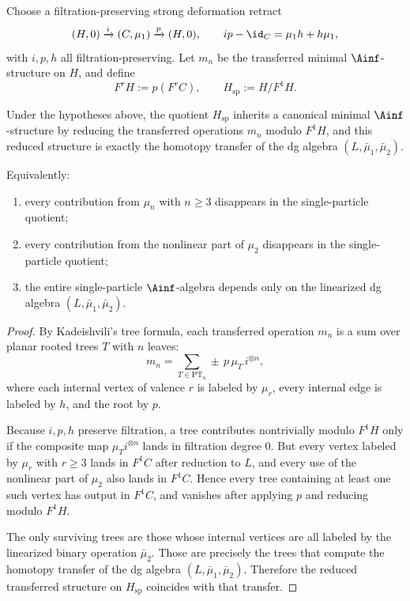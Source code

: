 Choose a filtration-preserving strong deformation retract
\[
(H,0)\xrightarrow{i}(C,\mu_1)\xrightarrow{p}(H,0),
\qquad
ip-\id_C=\mu_1 h+h\mu_1,
\]
with $i,p,h$ all filtration-preserving. Let $m_n$ be the transferred minimal $\Ainf$-structure on $H$, and define
\[
F^rH:=p(F^rC),
\qquad
H_{\mathrm{sp}}:=H/F^1H.
\]

\begin{theorem}
Under the hypotheses above, the quotient $H_{\mathrm{sp}}$ inherits a canonical minimal $\Ainf$-structure by reducing the transferred operations $m_n$ modulo $F^1H$, and this reduced structure is exactly the homotopy transfer of the dg algebra $(L,\bar\mu_1,\bar\mu_2)$.

Equivalently:
\begin{enumerate}[label=\textup{(\alph*)},leftmargin=2em]
\item every contribution from $\mu_n$ with $n\ge 3$ disappears in the single-particle quotient;
\item every contribution from the nonlinear part of $\mu_2$ disappears in the single-particle quotient;
\item the entire single-particle $\Ainf$-algebra depends only on the linearized dg algebra $(L,\bar\mu_1,\bar\mu_2)$.
\end{enumerate}
\end{theorem}

\begin{proof}
By Kadeishvili's tree formula, each transferred operation $m_n$ is a sum over planar rooted trees $T$ with $n$ leaves:
\[
m_n=\sum_{T\in \mathrm{PT}_n}\pm\,p\,\mu_T\,i^{\otimes n},
\]
where each internal vertex of valence $r$ is labeled by $\mu_r$, every internal edge is labeled by $h$, and the root by $p$.

Because $i,p,h$ preserve filtration, a tree contributes nontrivially modulo $F^1H$ only if the composite map $\mu_T i^{\otimes n}$ lands in filtration degree $0$. But every vertex labeled by $\mu_r$ with $r\ge 3$ lands in $F^1C$ after reduction to $L$, and every use of the nonlinear part of $\mu_2$ also lands in $F^1C$. Hence every tree containing at least one such vertex has output in $F^1C$, and vanishes after applying $p$ and reducing modulo $F^1H$.

The only surviving trees are those whose internal vertices are all labeled by the linearized binary operation $\bar\mu_2$. Those are precisely the trees that compute the homotopy transfer of the dg algebra $(L,\bar\mu_1,\bar\mu_2)$. Therefore the reduced transferred structure on $H_{\mathrm{sp}}$ coincides with that transfer.
\end{proof}

